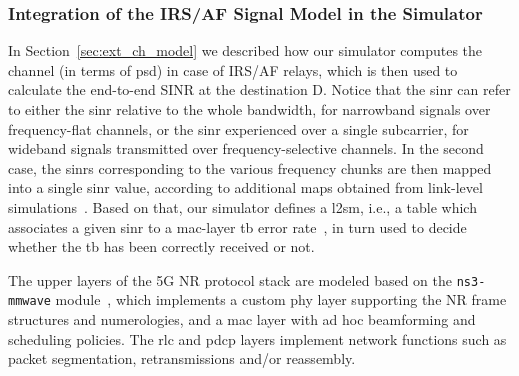 \subsubsection{Integration of the IRS/AF Signal Model in the Simulator}
In Section~\ref{sec:ext_ch_model} we described how our simulator computes the channel (in terms of \gls{psd}) in case of IRS/AF relays, which is then used to calculate the end-to-end SINR at the destination D. 
Notice that the \gls{sinr} can refer to either the \gls{sinr} relative to the whole bandwidth, for narrowband signals over frequency-flat channels, or the \gls{sinr} experienced over a single subcarrier, for wideband signals transmitted over frequency-selective channels. 
In the second case, the \glspl{sinr} corresponding to the various frequency chunks are then mapped into a single \gls{sinr} value, according to additional maps obtained from link-level simulations~\cite{lagen2020new}.
Based on that, our simulator defines a \gls{l2sm}, i.e., a table which associates a given \gls{sinr} to a \gls{mac}-layer \gls{tb} error rate~\cite{mezzavilla2012lightweight}, in turn used to  decide whether the \gls{tb} has been correctly received or not.

The upper layers of the 5G NR protocol stack are modeled based on the \texttt{ns3-mmwave} module~\cite{mezzavilla2018end}, which implements a custom \gls{phy} layer supporting the NR frame structures and numerologies, and a \gls{mac} layer with ad hoc beamforming and scheduling policies. 
The \gls{rlc} and \gls{pdcp} layers implement network functions such as packet segmentation, retransmissions and/or reassembly. 






